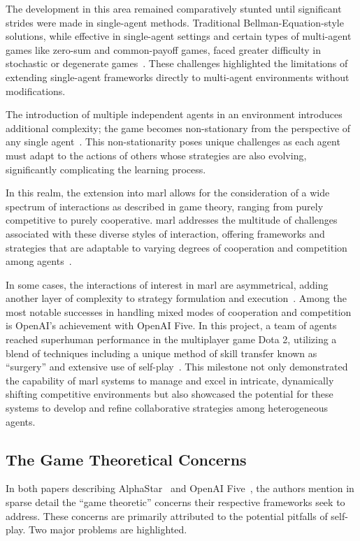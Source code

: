 The development in this area remained comparatively stunted until 
significant strides were made in single-agent methods. 
Traditional Bellman-Equation-style solutions, while effective in single-agent 
settings and certain types of multi-agent games like zero-sum and 
common-payoff games, faced greater difficulty in stochastic or 
degenerate games~\cite{shoham2007}.
These challenges highlighted the limitations of extending single-agent 
frameworks directly to multi-agent environments without modifications.

The introduction of multiple independent agents in an environment introduces 
additional complexity; the game becomes non-stationary from 
the perspective of any single agent~\cite{busoniu2008}. 
This non-stationarity poses unique challenges as each agent must adapt 
to the actions of others whose strategies are also evolving, 
significantly complicating the learning process.

In this realm, the extension into \gls{marl} allows for the consideration 
of a wide spectrum of interactions as described in game theory, 
ranging from purely competitive to purely cooperative. 
\gls{marl} addresses the multitude of challenges associated with these 
diverse styles of interaction, offering frameworks and strategies that 
are adaptable to varying degrees of cooperation and competition among 
agents~\cite{lowe2020}.

In some cases, the interactions of interest in \gls{marl} are asymmetrical, 
adding another layer of complexity to strategy formulation and 
execution~\cite*{sun2023}.
Among the most notable successes in handling mixed modes of cooperation 
and competition is OpenAI's achievement with OpenAI Five. In this project, 
a team of agents reached superhuman performance in the multiplayer game Dota 2,
utilizing a blend of techniques including a unique method of skill transfer 
known as ``surgery'' and extensive use of self-play~\cite{berner2019}.
This milestone not only demonstrated the capability of \gls{marl} systems to 
manage and excel in intricate, dynamically shifting competitive environments 
but also showcased the potential for these systems to develop and refine 
collaborative strategies among heterogeneous agents.

    \subsection*{The Game Theoretical Concerns}%

In both papers describing AlphaStar~\cite{vinyals2019} and OpenAI 
Five~\cite{berner2019}, the authors mention in sparse detail the 
``game theoretic'' concerns their respective frameworks seek to address. 
These concerns are primarily attributed to the potential pitfalls of self-play. 
Two major problems are highlighted.

